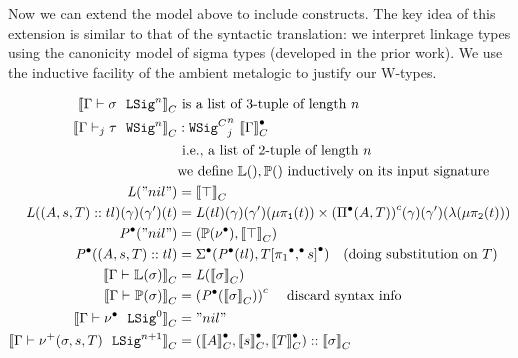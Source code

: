 Now we can extend the model above to include \TT constructs.
The key idea of this extension is similar to that of the syntactic translation:
we interpret linkage types using the canonicity model of sigma types (developed in the prior work).
We use the inductive facility of the ambient meta\-logic to justify our W-types.

\newcommand{\CWmodel}{\ensuremath{\mathit{W}^C}}
\newcommand{\CWsup}{\ensuremath{\mathit{W^Csup}}}
\newcommand{\CWrec}{\ensuremath{\mathit{W^Crec}}}

\begin{align*}
  \denotesC{\goodSig{\Gm}{\lsig}{n}} & \text{ is a list of 3-tuple of length $n$  } \\
  \denotesC{\goodWSigU{j}{\Gm}{\wsig}{n}} &: \GMWSig{j}{\denotesCC{\Gm}}{n} \\ 
    &\text{ i.e., a list of 2-tuple of length $n$ } \\
  & \text{we define }\TyLkg{}, \TyTkg{} \text{ inductively on its input signature} \\ 
  \mathit{L}("nil") &=  \denotesC{\top}  \\
  \mathit{L}((A,s,T) :: tl)(\gm)(\gm')(t) &= {\mathit{L}(tl)}(\gm)(\gm')(\lkgproj{1}{t}) \times \Gmodel{\GluedPi{A}{T}}(\gm)(\gm')(\lam{\lkgproj{2}{t}})   \\
  \Glued{\mathit{P}}("nil") &= ( \TyTkg{\LSigEmp} , \denotesC{\top} )\\
  \Glued{\mathit{P}}((A,s,T) :: tl) &= \Glued{\Sigma}(\Glued{\mathit{P}}(tl), \Gsub{T}{\GSubstExt{\Glued{\pi_1}}{s}}) \quad \text{(doing substitution on $T$)} \\
  \denotesC{\goodType{\Gm}{\TyLkg{\lsig}}{}} &= {\mathit{L}(\denotesC{\lsig})} \\
  \denotesC{\goodType{\Gm}{\TyTkg{\lsig}}{}} &= \Gmodel{\Glued{\mathit{P}}(\denotesC{\lsig})} \quad \text{ discard syntax info}  \\
  \denotesC{\goodSig{\Gm}{\LSigEmp}{0}} &= "nil"\\ 
  \denotesC{\goodSig{\Gm}{\LSigAdd{\lsig}{s}{T}}{n+1}} &= (\denotesCC{A}, \denotesCC{s}, \denotesCC{T})::\denotesC{\lsig}\\ 

\end{align*}
